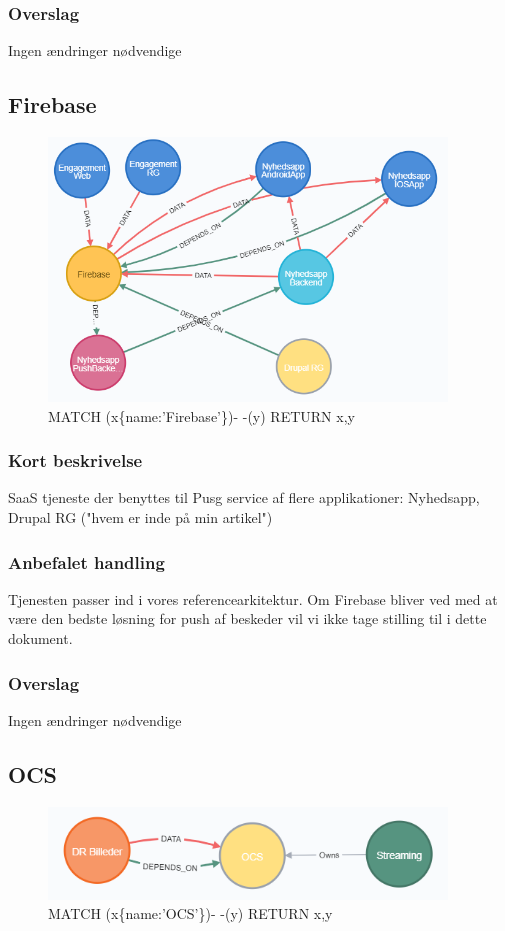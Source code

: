 \documentclass{article}
\begin{document}
\subsubsection{Overslag}
Ingen ændringer nødvendige


\subsection{Firebase}
\begin{figure}[h]
\includegraphics[width=300pt]{Firebase.PNG}
\caption{MATCH (x\{name:'Firebase'\})- -(y) RETURN x,y}
\end{figure}
\subsubsection{Kort beskrivelse}
SaaS tjeneste der benyttes til Pusg service af flere applikationer:
Nyhedsapp, Drupal RG ("hvem er inde på min artikel")
\subsubsection{Anbefalet handling}
Tjenesten passer ind i vores referencearkitektur. Om Firebase bliver ved med at være den bedste løsning for push af beskeder vil vi ikke tage stilling til i dette dokument.
\subsubsection{Overslag}
Ingen ændringer nødvendige


\subsection{OCS}
\begin{figure}[h]
\includegraphics[width=300pt]{OCS.PNG}
\caption{MATCH (x\{name:'OCS'\})- -(y) RETURN x,y}
\end{figure}
\end{document}
